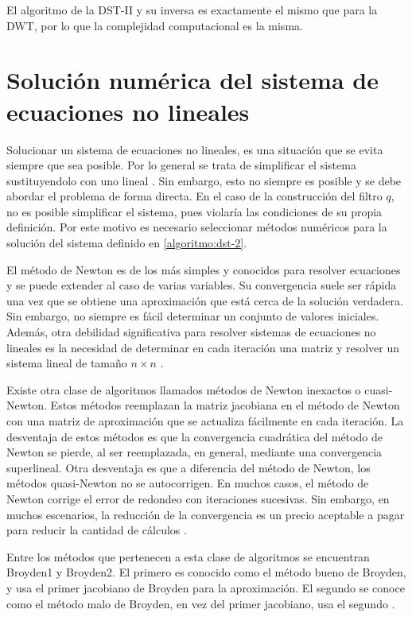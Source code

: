 El algoritmo de la DST-II y su inversa es exactamente el mismo que para la DWT, por lo que la complejidad computacional
es la misma.

\section{Solución numérica del sistema de ecuaciones no lineales}\label{numerical-solution}

Solucionar un sistema de ecuaciones no lineales, es una situación que se evita siempre que sea posible. Por lo general
se trata de simplificar el sistema sustituyendolo con uno lineal \cite{Burden2016}. Sin embargo, esto no siempre es posible y se debe abordar el problema de
forma directa. En el caso de la construcción del filtro $q$, no es posible simplificar el sistema, pues violaría
las condiciones de su propia definición. Por este motivo es necesario seleccionar métodos numéricos para la
solución del sistema definido en \ref{algoritmo:dst-2}.

El método de Newton es de los más simples y conocidos para resolver ecuaciones y se puede extender al caso de varias
variables. Su convergencia suele ser rápida una vez que se obtiene una aproximación que está cerca de la solución
verdadera. Sin embargo, no siempre es fácil determinar un conjunto de valores iniciales. Además, otra debilidad
significativa para resolver sistemas de ecuaciones no lineales es la necesidad de determinar en cada iteración 
una matriz y resolver un sistema lineal de tamaño $n\times n$ \cite{Burden2016}. 

Existe otra clase de algoritmos llamados métodos de Newton inexactos o cuasi-Newton. Estos métodos reemplazan la
matriz jacobiana en el método de Newton con una matriz de aproximación que se actualiza fácilmente en 
cada iteración. La desventaja de estos métodos es que la convergencia cuadrática del método de Newton se pierde,
al ser reemplazada, en general, mediante una convergencia superlineal. Otra desventaja es que a diferencia 
del método de Newton, los métodos quasi-Newton no se autocorrigen. En muchos casos, el método de Newton
corrige el error de redondeo con iteraciones sucesivas. Sin embargo, en muchos escenarios, la reducción 
de la convergencia es un precio aceptable a pagar para reducir la cantidad de cálculos \cite{Burden2016}. 

Entre los métodos que pertenecen a esta clase de algoritmos se encuentran Broyden1 y Broyden2. El primero es conocido
como el método bueno de Broyden, y usa el primer jacobiano de Broyden para la aproximación. El segundo se conoce
como el método malo de Broyden, en vez del primer jacobiano, usa el segundo \cite{broyden}.

